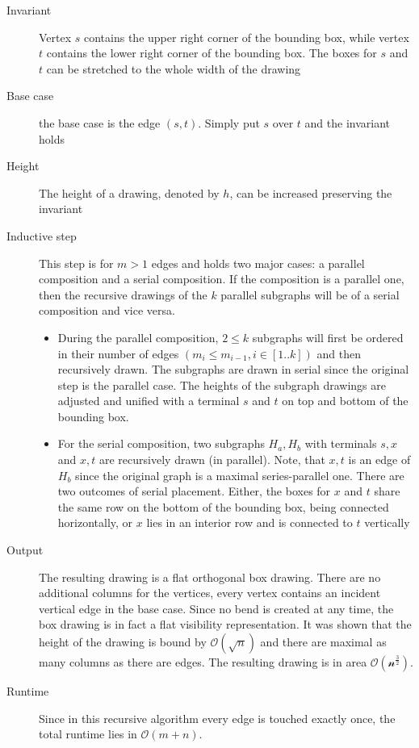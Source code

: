 \begin{description}
	\item[Invariant] Vertex $s$ contains the upper right corner of the bounding box, while vertex $t$ contains the lower right corner of the bounding box. The boxes for $s$ and $t$ can be stretched to the whole width of the drawing 
	\item[Base case] the base case is the edge $(s,t)$. Simply put $s$ over $t$ and the invariant holds
	\item[Height] The height of a drawing, denoted by $h$, can be increased preserving the invariant
	\item[Inductive step] This step is for $m>1$ edges and holds two major cases: a parallel composition and a serial composition. If the composition is a parallel one, then the recursive drawings of the $k$ parallel subgraphs will be of a serial composition and vice versa.
	\begin{itemize}
		\item During the parallel composition, $2\leq k$ subgraphs will first be ordered in their number of edges $(m_i \leq m_{i-1}, i \in[1..k])$ and then recursively drawn. The subgraphs are drawn in serial since the original step is the parallel case. The heights of the subgraph drawings are adjusted and unified with a terminal $s$ and $t$ on top and bottom of the bounding box.
		\item For the serial composition, two subgraphs $H_a, H_b$ with terminals  $s,x$ and $x,t$ are recursively drawn (in parallel). Note, that $x,t$ is an edge of $H_b$ since the original graph is a maximal series-parallel one. There are two outcomes of serial placement. Either, the boxes for $x$ and $t$ share the same row on the bottom of the bounding box, being connected horizontally, or $x$ lies in an interior row and is connected to $t$ vertically
	\end{itemize}
	\item[Output] The resulting drawing is a flat orthogonal box drawing. There are no additional columns for the vertices, every vertex contains an incident vertical edge in the base case. Since no bend is created at any time, the box drawing is in fact a flat visibility representation. It was shown that the height of the drawing is bound by $\mathcal{O}(\sqrt{n})$ and there are maximal as many columns as there are edges. The resulting drawing is in area $\mathcal{O(n^{\frac{3}{2}})}$.
	\item[Runtime] Since in this recursive algorithm every edge is touched exactly once, the total runtime lies in $\mathcal{O}(m+n)$.
\end{description}
